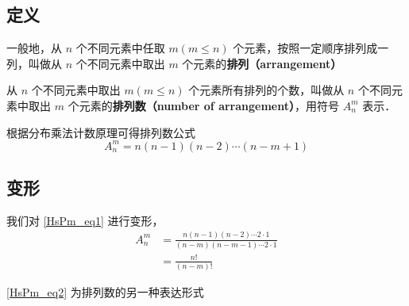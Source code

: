 
\begin{issues}
\end{issues}


\subsection{定义}
一般地，从 $n$ 个不同元素中任取 $m(m \leq n)$ 个元素，按照一定顺序排列成一列，叫做从 $n$ 个不同元素中取出 $m$ 个元素的\textbf{排列（arrangement）}

从 $n$ 个不同元素中取出 $m(m \leq n)$ 个元素所有排列的个数，叫做从 $n$ 个不同元素中取出 $m$ 个元素的\textbf{排列数（number of arrangement）}，用符号 $A_n^m$ 表示．

根据分布乘法计数原理可得排列数公式\begin{equation}\label{HsPm_eq1}
A_n^m = n (n - 1)(n - 2) \cdots (n - m + 1)
\end{equation}

\subsection{变形}
我们对 \autoref{HsPm_eq1} 进行变形，\begin{equation}\label{HsPm_eq2}
\begin{aligned}
A_n^m &= \frac{n(n - 1)(n - 2) \cdots 2 \cdot 1}{(n - m)(n - m - 1) \cdots 2 \cdot 1}\\
&= \frac{n!}{(n - m)!}
\end{aligned}
\end{equation}

\autoref{HsPm_eq2} 为排列数的另一种表达形式